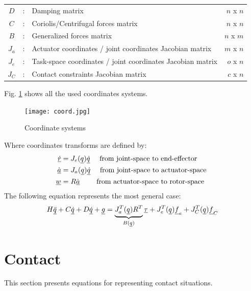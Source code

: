 {\begin{table}[htbp]
\begin{tabular}{ c c l r }
			$D$             &  :  & Damping matrix                                             & $n$ x $n$ \\
			$C$             &  :  & Coriolis/Centrifugal forces matrix                         & $n$ x $n$ \\
			$B$             &  :  & Generalized forces matrix                                  & $n$ x $m$ \\
			$J_a$           &  :  & Actuator coordinates / joint coordinates Jacobian matrix   & $m$ x $n$ \\
			$J_e$           &  :  & Task-space coordinates / joint coordinates Jacobian matrix & $o$ x $n$ \\
			$J_C$           &  :  & Contact constraints Jacobian matrix                        & $c$ x $n$  \\
		\hline \hline
        \end{tabular}		
	\label{tab:nom}
\end{table}




Fig. \ref{fig:coord} shows all the used coordinates systems. 
%
\begin{figure}[H]
	\centering
		\texttt{[image: coord.jpg]}
	\caption{Coordinate systems}%
	\label{fig:coord}
\end{figure}
%
Where coordinates transforms are defined by:
%
\begin{align}
\underline{\dot{r}}   &= J_e( \underline{q} ) \underline{\dot{q} }  \quad \text{ from joint-space to end-effector   } \\
\underline{\dot{a}}   &= J_a( \underline{q} ) \underline{\dot{q} }  \quad \text{ from joint-space to actuator-space } \\
\underline{w }        &= R              \underline{\dot{a} }  \quad\quad \text{ from actuator-space to rotor-space } 
\label{eq:coord_transform2}
\end{align}
%
%
The following equation represents the most general case:
%
\begin{align}
H \underline{\ddot{q}} + C \underline{\dot{q}} + D \underline{\dot{q}} + \underline{g} =  \underbrace{ J_a^T(\underline{q}) R^T }_{B(\underline{q})}  \underline{\tau} + J_e^T(\underline{q}) \underline{f}_e + J_C^T(\underline{q}) \underline{f}_C
\label{eq:manipulator_gen}
\end{align}


\newpage
\section{Contact}
\label{sec:contact}

This section presents equations for representing contact situations.

}
